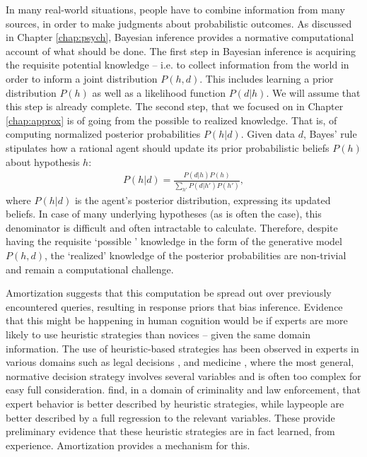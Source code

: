In many real-world situations, people have to combine information from many sources, in order to make judgments about probabilistic outcomes. As discussed in Chapter \ref{chap:psych}, Bayesian inference provides a normative computational account of what should be done. The first step in Bayesian inference is acquiring the requisite potential knowledge  -- i.e. to collect information from the world in order to inform a joint distribution $P(h,d)$. This includes learning a prior distribution $P(h)$ as well as a likelihood function $P(d | h)$. We will assume that this step is already complete. The second step, that we focused on in Chapter \ref{chap:approx} is of going from the possible to realized knowledge. That is, of computing normalized posterior probabilities  $P(h |d)$. Given data $d$, Bayes' rule stipulates how a rational agent should update its prior probabilistic beliefs $P(h)$ about hypothesis $h$:
\begin{align}
    P(h|d) = \frac{P(d|h)P(h)}{\sum_{h'} P(d|h') P(h')},
\end{align}
where $P(h|d)$ is the agent's posterior distribution, expressing its updated beliefs. In case of many underlying hypotheses (as is often the case), this denominator is difficult and often intractable to calculate. Therefore, despite having the requisite `possible ' knowledge in the form of the generative model $P(h,d)$, the `realized' knowledge of the posterior probabilities are non-trivial and remain a computational challenge.

Amortization suggests that this computation be spread out over previously encountered queries, resulting in response priors that bias inference. Evidence that this might be happening in human cognition would be if experts are more likely to use heuristic strategies than novices -- given the same domain information. The use of heuristic-based strategies has been observed in experts in various domains such as legal decisions \citep{dhami2001bailing}, and medicine \citep{reyna2006physician}, where the most general, normative decision strategy involves several variables and is often too complex for easy full consideration. \cite{garcia2009take} find, in a domain of criminality and law enforcement, that expert behavior is better described by heuristic strategies, while laypeople are better described by a full regression to the relevant variables. These provide preliminary evidence that these heuristic strategies are in fact learned, from experience. Amortization provides a mechanism for this.

